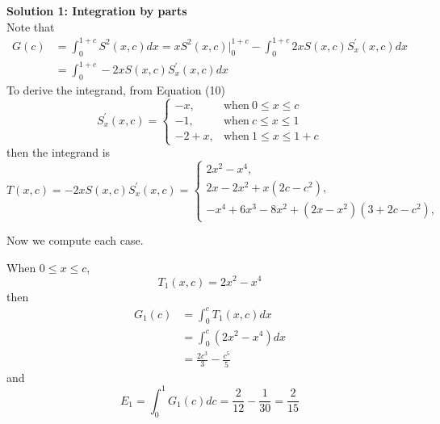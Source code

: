 \documentclass[12pt]{simple_doc}
\begin{document}
    \medskip
    \textbf{Solution 1: Integration by parts}\\
    Note that
    \begin{equation*}
        \begin{aligned}
            G(c) &= \int_0^{1 + c} S^2(x, c) dx = xS^2(x, c)\biggr\rvert_0^{1+c}
                    - \int_0^{1 + c} 2xS(x,c)S_x^{'}(x,c) dx\\
                 &= \int_0^{1 + c} -2xS(x,c)S_x^{'}(x,c) dx
        \end{aligned}
    \end{equation*}
    To derive the integrand, from Equation (10)
    \begin{equation*}
        S_x^{'}(x, c) =
            \begin{cases}
              -x, & \text{when}\ 0 \leqslant x \leqslant c\\
              -1, & \text{when}\ c \leqslant x \leqslant 1\\
              -2 +x, & \text{when}\ 1 \leqslant x \leqslant 1 + c
            \end{cases}
    \end{equation*}
    then the integrand is
    \begin{equation*}
        T(x, c) = -2xS(x, c)S_x^{'}(x, c) =
            \begin{cases}
              2x^2 - x^4, &\\
              2x - 2x^2 + x(2c - c^2), &\\
              -x^4 +6x^3 -8x^2 + (2x - x^2)(3 + 2c - c^2), &
            \end{cases}
    \end{equation*}

    Now we compute each case.

    When $0 \leqslant x \leqslant c$,
    \begin{equation*}
        T_1(x, c) = 2x^2 - x^4
    \end{equation*}
    then
    \begin{equation*}
		\begin{aligned}
		G_1(c) &= \int_0^c T_1(x, c) dx \\
		   &= \int_0^c (2x^2 - x^4) dx\\
           &= \frac{2c^3}{3} - \frac{c^5}{5}
		\end{aligned}
	\end{equation*}
    and
    \begin{equation*}
        E_1 = \int_0^1 G_1(c)dc = \frac{2}{12} - \frac{1}{30} = \frac{2}{15}
    \end{equation*}
\end{document}
